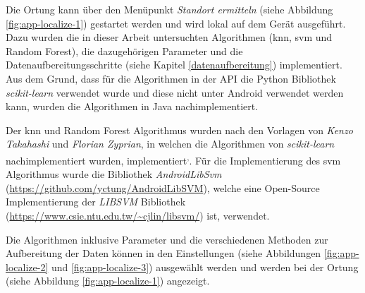 Die Ortung kann über den Menüpunkt \textit{Standort ermitteln} (siehe Abbildung \ref{fig:app-localize-1}) gestartet werden und wird lokal auf dem Gerät ausgeführt. Dazu wurden die in dieser Arbeit untersuchten Algorithmen (\gls{knn}, \gls{svm} und Random Forest), die dazugehörigen Parameter und die Datenaufbereitungsschritte (siehe Kapitel \ref{datenaufbereitung}) implementiert. Aus dem Grund, dass für die Algorithmen in der API die Python Bibliothek \textit{scikit-learn} verwendet wurde und diese nicht unter Android verwendet werden kann, wurden die Algorithmen in Java nachimplementiert. 

Der \gls{knn} und Random Forest Algorithmus wurden nach den Vorlagen von \textit{Kenzo Takahashi} und \textit{Florian Zyprian}, in welchen die Algorithmen von \textit{scikit-learn} nachimplementiert wurden, implementiert\textsuperscript{,}. Für die Implementierung des \gls{svm} Algorithmus wurde die Bibliothek \textit{AndroidLibSvm} (\url{https://github.com/yctung/AndroidLibSVM}), welche eine Open-Source Implementierung der \textit{LIBSVM} Bibliothek (\url{https://www.csie.ntu.edu.tw/~cjlin/libsvm/}) ist, verwendet.

Die Algorithmen inklusive Parameter und die verschiedenen Methoden zur Aufbereitung der Daten können in den Einstellungen (siehe Abbildungen \ref{fig:app-localize-2} und \ref{fig:app-localize-3}) ausgewählt werden und werden bei der Ortung (siehe Abbildung \ref{fig:app-localize-1}) angezeigt.

